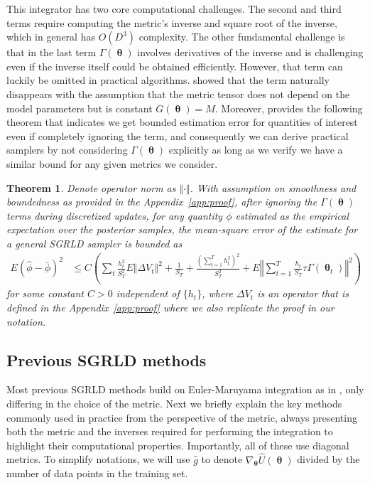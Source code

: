 \documentclass[10pt]{article} %
\DeclareMathOperator{\btheta}{\boldsymbol{\theta}}
\theoremstyle{plain}
\newtheorem{theorem}{Theorem}[section]
\theoremstyle{definition}
\theoremstyle{remark}
\begin{document}
This integrator has two core computational challenges. The second and third terms require computing the metric's inverse and square root of the inverse, which in general has $O(D^3)$ complexity. 
The other fundamental challenge is that in the last term $\Gamma(\btheta)$ involves derivatives of the inverse and is challenging even if the inverse itself could be obtained efficiently. However, that term can luckily be omitted in practical algorithms. \citet{Girolami2011} showed that the term naturally disappears with the assumption that the metric tensor does not depend on the model parameters but is constant $G(\btheta)=M$. Moreover, \citet{Li2016} provides the following theorem that indicates we get bounded estimation error for quantities of interest even if completely ignoring the term, and consequently we can derive practical samplers by not considering $\Gamma(\btheta)$ explicitly as long as we verify we have a similar bound for any given metrics we consider.

\begin{theorem}
\label{theorem:general}
Denote operator norm as $\Vert\cdot\Vert$. With assumption on smoothness and boundedness as provided in the Appendix~\ref{app:proof}, after ignoring the $\Gamma(\btheta)$ terms during discretized updates, for any quantity $\phi$ estimated as the empirical expectation over the posterior samples, the mean-square error of the estimate for a general SGRLD sampler is bounded as
\begin{align*}
E\left(\hat{\phi}-\bar{\phi}\right)^{2} & \leq
C\left(\sum_{t}\frac{h_{t}^2}{S_{T}^{2}}E\Vert\Delta V_{t}\Vert^{2}+\frac{1}{S_T}+\frac{(\sum_{t=1}^{T}h_{t}^2)^{2}}{S_{T}^2} 
+E\left\Vert \sum_{t=1}^{T}\frac{h_{t}}{S_T}\tau\Gamma(\btheta_t) \right\Vert^{2}\right)
\end{align*}
for some constant $C > 0$ independent of $\{h_t\}$, where $\Delta V_{t}$ is an operator that is defined in the Appendix~\ref{app:proof} where we also replicate the proof in our notation.
\end{theorem}

\subsection{Previous SGRLD methods}

Most previous SGRLD methods build on Euler-Maruyama integration as in , only differing in the choice of the metric. Next we briefly explain the key methods commonly used in practice from the perspective of the metric, always presenting both the metric and the inverses required for performing the integration to highlight their computational properties. Importantly, all of these use diagonal metrics. To simplify notations, we will use $\hat{g}$ to denote $\nabla_{\btheta}\hat{U}(\btheta)$ divided by the number of data points in the training set.
\end{document}

